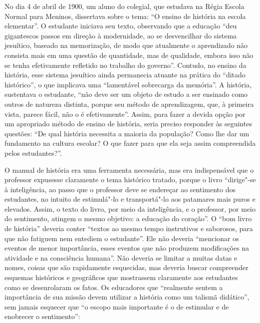 \noindent{}No dia 4 de abril de 1900, um aluno do colegial, que estudava na Régia
Escola Normal para Meninos, dissertava sobre o tema: ``O ensino de
história na escola elementar''. O estudante iniciava seu texto,
observando que a educação ``deu gigantescos passos em direção à
modernidade, ao se desvencilhar do sistema jesuítico, baseado na
memorização, de modo que atualmente o aprendizado não consista mais em
uma questão de quantidade, mas de qualidade, embora isso não se tenha
efetivamente refletido no trabalho do governo''. Contudo, no ensino da
história, esse sistema jesuítico ainda permanecia atuante na prática do
``ditado histórico'', o que implicava uma ``lamentável sobrecarga da
memória''. A história, sustentava o estudante, ``não deve ser um objeto
de estudo a ser ensinado como outros de natureza distinta, porque seu
método de aprendizagem, que, à primeira vista, parece fácil, não o é
efetivamente''. Assim, para fazer a devida opção por um apropriado
método de ensino de história, seria preciso responder às seguintes
questões: ``De qual história necessita a maioria da população? Como lhe
dar um fundamento na cultura escolar? O que fazer para que ela seja
assim compreendida pelos estudantes?''.

O manual de história era uma ferramenta necessária, mas era
indispensável que o professor expusesse claramente o tema histórico
tratado, porque o livro ``dirige"-se à inteligência, ao passo que o
professor deve se endereçar ao sentimento dos estudantes, no intuito de
estimulá"-lo e transportá"-lo aos patamares mais puros e elevados. Assim,
o texto do livro, por meio da inteligência, e o professor, por meio do
sentimento, atingem o mesmo objetivo: a educação do coração''. O ``bom
livro de história'' deveria conter ``textos ao mesmo tempo instrutivos e
saborosos, para que não fatiguem nem entediem o estudante''. Ele não
deveria ``mencionar os eventos de menor importância, esses eventos que
não produzem modificações na atividade e na consciência humana''. Não
deveria se limitar a muitas datas e nomes, coisas que são rapidamente
esquecidas, mas deveria buscar compreender esquemas históricos e
geográficos que mostrassem claramente aos estudantes como se
desenrolaram os fatos. Os educadores que ``realmente sentem a
importância de sua missão devem utilizar a história como um talismã
didático'', sem jamais esquecer que ``o escopo mais importante é o de
estimular e de enobrecer o sentimento'':

